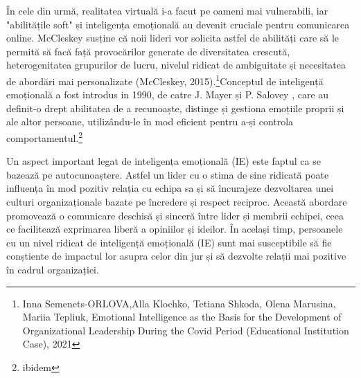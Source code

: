 \documentclass[a4paper, 12pt]{article}
\begin{document}
	\quad În cele din urmă,  realitatea virtuală i-a facut pe oameni mai vulnerabili, iar "abilitățile soft" și inteligența emoțională au devenit cruciale pentru comunicarea online. McCleskey susține că noii lideri vor solicita astfel de abilități care să le permită să facă față provocărilor generate de diversitatea crescută, heterogenitatea grupurilor de lucru, nivelul ridicat de ambiguitate și necesitatea de abordări mai personalizate (McCleskey, 2015).\footnote { Inna Semenets-ORLOVA,Alla Klochko, Tetiana Shkoda, Olena Marusina, Mariia Tepliuk, Emotional Intelligence as the Basis for the Development of Organizational Leadership During the Covid Period (Educational Institution Case), 2021}Conceptul de inteligență emoțională a fost introdus in 1990, de catre J. Mayer și P. Salovey , care au definit-o drept abilitatea de a recunoaște, distinge și gestiona emoțiile proprii și ale altor persoane, utilizându-le în mod eficient pentru a-și controla comportamentul.\footnote{ibidem} 

	\quad\quad Un aspect important legat de inteligența emoțională (IE) este faptul ca se bazează pe autocunoaștere. Astfel un lider cu o stima de sine ridicată poate influența în mod pozitiv relația cu echipa sa și să încurajeze dezvoltarea unei culturi organizaționale bazate pe încredere și respect reciproc. Această abordare promovează o comunicare deschisă și sinceră între lider și membrii echipei, ceea ce facilitează exprimarea liberă a opiniilor și ideilor. În același timp, persoanele cu un nivel ridicat de inteligență emoțională (IE) sunt mai susceptibile să fie conștiente de impactul lor asupra celor din jur și să dezvolte relații mai pozitive în cadrul organizației.
\end{document}
